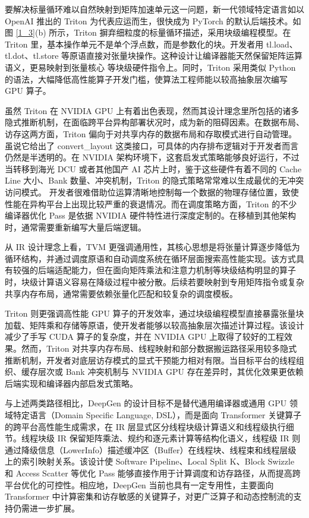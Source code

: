 要解决标量循环难以自然映射到矩阵加速单元这一问题，新一代领域特定语言如以 OpenAI 推出的 Triton 为代表应运而生，很快成为 PyTorch\cite{paszke2019pytorch} 的默认后端技术。如图 \ref{1_3}(b) 所示，Triton 摒弃细粒度的标量循环描述，采用块级编程模型。在 Triton 里，基本操作单元不是单个浮点数，而是参数化的块。开发者用 tl.load、tl.dot、tl.store 等原语直接对张量块操作。这种设计让编译器能天然保留矩阵运算语义，更易映射到张量核心\cite{bhaskaracharya2020automatic} 等块级硬件指令上。同时，Triton 采用类似 Python 的语法，大幅降低高性能算子开发门槛，使算法工程师能以较高抽象层次编写 GPU 算子。

虽然 Triton 在 NVIDIA GPU 上有着出色表现，然而其设计理念里所包括的诸多隐式推断机制，在面临跨平台异构部署状况时，成为新的阻碍因素。在数据布局、访存\cite{zhou2026linear}这两方面，Triton 偏向于对共享内存的数据布局和存取模式进行自动管理。虽说它给出了 convert\_layout 这类接口，可具体的内存排布逻辑对于开发者而言仍然是半透明的。在 NVIDIA 架构环境下，这套启发式策略能够良好运行，不过当转移到海光 DCU 或者其他国产 AI 芯片上时，鉴于这些硬件有着不同的 Cache Line 大小、Bank 数量、冲突机制，Triton 的隐式策略常常难以生成最优的无冲突访问模式。
开发者很难借助位运算清晰地控制每一个数据的物理存储位置，致使性能在异构平台上出现比较严重的衰退情况。而在调度策略方面，Triton 的不少编译器优化 Pass 是依据 NVIDIA 硬件特性进行深度定制的。在移植到其他架构时，通常需要重新编写大量后端逻辑。

从 IR 设计理念上看，TVM 更强调通用性，其核心思想是将张量计算逐步降低为循环结构，并通过调度原语和自动调度系统在循环层面搜索高性能实现。该方式具有较强的后端适配能力，但在面向矩阵乘法和注意力机制等块级结构明显的算子时，块级计算语义容易在降级过程中被分散。后续若要映射到专用矩阵指令或复杂共享内存布局，通常需要依赖张量化匹配和较复杂的调度模板。

Triton 则更强调高性能 GPU 算子的开发效率，通过块级编程模型直接暴露张量块加载、矩阵乘和存储等原语，使开发者能够以较高抽象层次描述计算过程。该设计减少了手写 CUDA 算子的复杂度，并在 NVIDIA GPU 上取得了较好的工程效果。然而，Triton 对共享内存布局、线程映射和部分数据搬运路径采用较多隐式推断机制，开发者对底层访存模式的显式干预能力相对有限。当目标平台的线程组织、缓存层次或 Bank 冲突机制与 NVIDIA GPU 存在差异时，其优化效果更依赖后端实现和编译器内部启发式策略。

与上述两类路径相比，DeepGen 的设计目标不是替代通用编译器或通用 GPU 领域特定语言（Domain Specific Language, DSL），而是面向 Transformer 关键算子的跨平台高性能生成需求，在 IR 层显式区分线程块级计算语义和线程级执行细节。线程块级 IR 保留矩阵乘法、规约和逐元素计算等结构化语义，线程级 IR 则通过降级信息（LowerInfo）描述缓冲区（Buffer）在线程块、线程束和线程层级上的索引映射关系。该设计使 Software Pipeline、Local Split K、Block Swizzle 和 Access Scatter 等优化 Pass 能够直接作用于计算调度和访存路径，从而提高跨平台优化的可控性。相应地，DeepGen 当前也具有一定专用性，主要面向 Transformer 中计算密集和访存敏感的关键算子，对更广泛算子和动态控制流的支持仍需进一步扩展。

